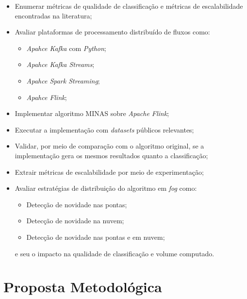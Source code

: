 \begin{itemize}
    \item Enumerar métricas de qualidade de classificação e métricas de
    escalabilidade encontradas na literatura;
    \item Avaliar plataformas de processamento distribuído de fluxos como:
    \begin{itemize}
        \item \emph{Apahce Kafka} com \emph{Python};
        \item \emph{Apahce Kafka Streams};
        \item \emph{Apahce Spark Streaming};
        \item \emph{Apahce Flink};
    \end{itemize}
    \item Implementar algoritmo MINAS sobre \emph{Apache Flink};
    \item Executar a implementação com \emph{datasets} públicos relevantes;
    \item Validar, por meio de comparação com o algoritmo original, se a
    implementação gera os mesmos resultados quanto a classificação;
    \item Extrair métricas de escalabilidade por meio de experimentação;
    \item Avaliar estratégias de distribuição do algoritmo em \emph{fog} como:
    \begin{itemize}
        \item Detecção de novidade nas pontas;
        \item Detecção de novidade na nuvem;
        \item Detecção de novidade nas pontas e em nuvem;
    \end{itemize}
    e seu o impacto na qualidade de classificação e volume computado.
\end{itemize}


\section{Proposta Metodológica}

